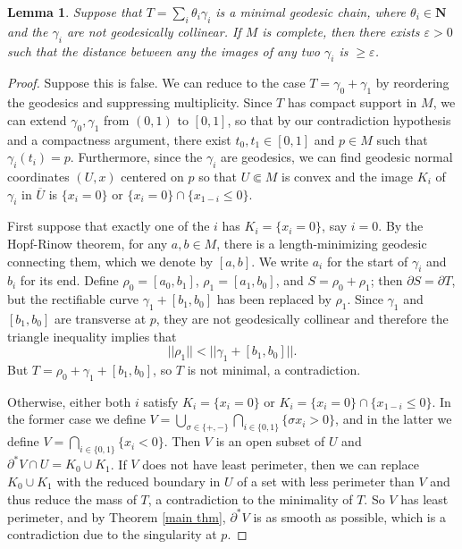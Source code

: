\documentclass[reqno,12pt,letterpaper]{amsart}
\newcommand{\NN}{\mathbf{N}}
\newtheorem{lemma}[theorem]{Lemma}
\theoremstyle{definition}
\numberwithin{equation}{section}
\begin{document}
\begin{lemma}\label{minimal geodesic chains are separated}
Suppose that $T = \sum_i \theta_i \gamma_i$ is a minimal geodesic chain, where $\theta_i \in \NN$ and the $\gamma_i$ are not geodesically collinear.
If $M$ is complete, then there exists $\varepsilon > 0$ such that the distance between any the images of any two $\gamma_i$ is $\geq \varepsilon$.
\end{lemma}
\begin{proof}
Suppose this is false.
We can reduce to the case $T = \gamma_0 + \gamma_1$ by reordering the geodesics and suppressing multiplicity.
Since $T$ has compact support in $M$, we can extend $\gamma_0, \gamma_1$ from $(0, 1)$ to $[0, 1]$, so that by our contradiction hypothesis and a compactness argument, there exist $t_0, t_1 \in [0, 1]$ and $p \in M$ such that $\gamma_i(t_i) = p$.
Furthermore, since the $\gamma_i$ are geodesics, we can find geodesic normal coordinates $(U, x)$ centered on $p$ so that $U \Subset M$ is convex and the image $K_i$ of $\gamma_i$ in $\overline U$ is $\{x_i = 0\}$ or $\{x_i = 0\} \cap \{x_{1-i} \leq 0\}$.

First suppose that exactly one of the $i$ has $K_i = \{x_i = 0\}$, say $i = 0$.
By the Hopf-Rinow theorem, for any $a,b \in M$, there is a length-minimizing geodesic connecting them, which we denote by $[a, b]$.
We write $a_i$ for the start of $\gamma_i$ and $b_i$ for its end.
Define $\rho_0 = [a_0, b_1]$, $\rho_1 = [a_1, b_0]$, and $S = \rho_0 + \rho_1$; then $\partial S = \partial T$, but the rectifiable curve $\gamma_1 + [b_1, b_0]$ has been replaced by $\rho_1$.
Since $\gamma_1$ and $[b_1, b_0]$ are transverse at $p$, they are not geodesically collinear and therefore the triangle inequality implies that
$$||\rho_1|| < ||\gamma_1 + [b_1, b_0]||.$$
But $T = \rho_0 + \gamma_1 + [b_1, b_0]$, so $T$ is not minimal, a contradiction.

Otherwise, either both $i$ satisfy $K_i = \{x_i = 0\}$ or $K_i = \{x_i = 0\} \cap \{x_{1-i} \leq 0\}$.
In the former case we define $V = \bigcup_{\sigma \in \{+, -\}} \bigcap_{i \in \{0, 1\}}\{\sigma x_i > 0\}$, and in the latter we define $V = \bigcap_{i \in \{0, 1\}} \{x_i < 0\}$.
Then $V$ is an open subset of $U$ and $\partial^* V \cap U = K_0 \cup K_1$.
If $V$ does not have least perimeter, then we can replace $K_0 \cup K_1$ with the reduced boundary in $U$ of a set with less perimeter than $V$ and thus reduce the mass of $T$, a contradiction to the minimality of $T$.
So $V$ has least perimeter, and by Theorem \ref{main thm}, $\partial^* V$ is as smooth as possible, which is a contradiction due to the singularity at $p$.
\end{proof}
\end{document}
